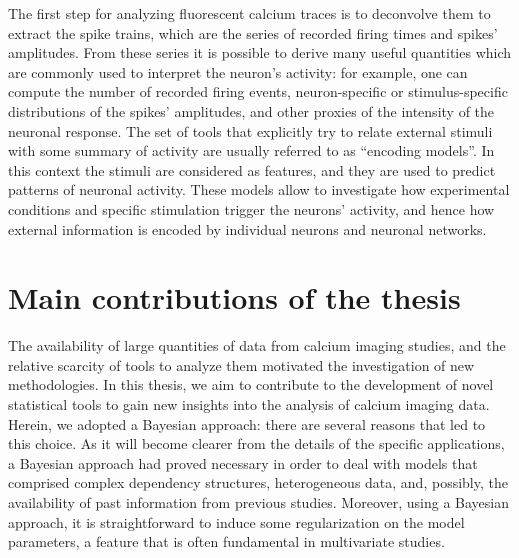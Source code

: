 The first step for analyzing fluorescent calcium traces is to deconvolve them to extract the spike trains, which are the series of recorded firing times and spikes' amplitudes.
From these series it is possible to derive many useful quantities which are commonly used to interpret the neuron's activity: for example, one can compute the number of recorded firing events, neuron-specific or stimulus-specific distributions of the spikes' amplitudes, and other proxies of the intensity of the neuronal response.
The set of tools that explicitly try to relate external stimuli with some summary of activity are usually referred to as ``encoding models''. In this context the stimuli are considered as features, and they are used to predict patterns of neuronal activity. These models allow to investigate how experimental conditions and specific stimulation trigger the neurons' activity, and hence how external information is encoded by individual neurons and neuronal networks.



\section*{Main contributions of the thesis}
The availability of large quantities of data from calcium imaging studies, and the relative scarcity of tools to analyze them motivated the investigation of new methodologies.
In this thesis, we aim to contribute to the development of novel statistical tools to gain new insights into the analysis of calcium imaging data.
Herein, we adopted a Bayesian approach: there are several reasons that led to this choice. As it will become clearer from the details of the specific applications, a Bayesian approach had proved necessary in order to deal with models that comprised complex dependency structures, heterogeneous data, and, possibly, the availability of past information from previous studies. Moreover, using a Bayesian approach, it is straightforward to induce some regularization on the model parameters, a feature that is often fundamental in multivariate studies.

